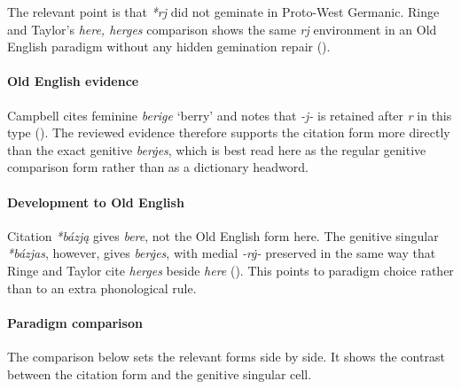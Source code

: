 \documentclass[
  british,
  a4paper,
]{article}
\begin{document}
The relevant point is that \emph{*rj} did not geminate in Proto-West
Germanic. Ringe and Taylor's \emph{here, herges} comparison shows the
same \emph{rj} environment in an Old English paradigm without any hidden
gemination repair ().

\paragraph{Old English evidence}\label{old-english-evidence-40}

Campbell cites feminine \emph{berige} `berry' and notes that \emph{-j-}
is retained after \emph{r} in this type
(). The reviewed evidence
therefore supports the citation form more directly than the exact
genitive \emph{berġes}, which is best read here as the regular genitive
comparison form rather than as a dictionary headword.

\paragraph{Development to Old
English}\label{development-to-old-english-40}

Citation \emph{*bázją} gives \emph{bere}, not the Old English form here.
The genitive singular \emph{*bázjas}, however, gives \emph{berġes}, with
medial \emph{-rġ-} preserved in the same way that Ringe and Taylor cite
\emph{herges} beside \emph{here} (). This points to paradigm choice rather than to an
extra phonological rule.

\paragraph{Paradigm comparison}\label{paradigm-comparison-1}

The comparison below sets the relevant forms side by side. It shows the
contrast between the citation form and the genitive singular cell.
\end{document}
